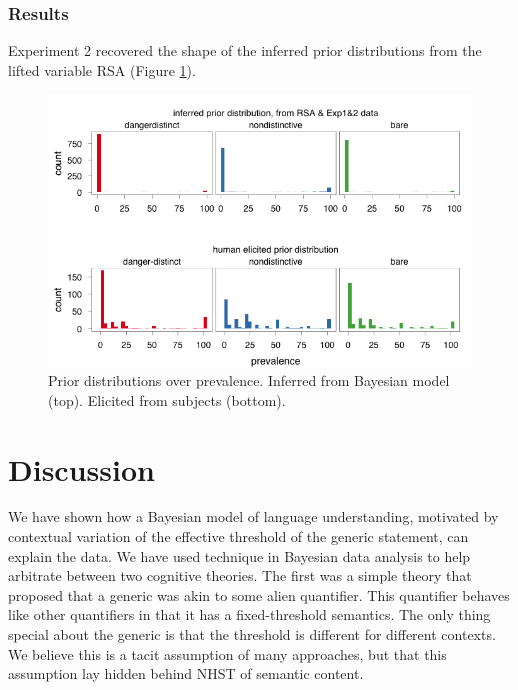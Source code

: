\documentclass[10pt,letterpaper]{article}
\begin{document}
\subsubsection{Results}

Experiment 2 recovered the shape of the inferred prior distributions from the lifted variable RSA (Figure \ref{fig:modeldatapriors}).


\begin{figure}
\centering
    \includegraphics[width=\columnwidth]{exp3hist_inferredMeanPriorExp1_2}
    \caption{Prior distributions over prevalence. Inferred from Bayesian model (top). Elicited from subjects (bottom).}
  \label{fig:modeldatapriors}
\end{figure}






\section{Discussion}

We have shown how a Bayesian model of language understanding, motivated by contextual variation of the effective threshold of the generic statement, can explain the data. We have used technique in Bayesian data analysis to help arbitrate between two cognitive theories. The first was a simple theory that proposed that a generic was akin to some alien quantifier. This quantifier behaves like other quantifiers in that it has a fixed-threshold semantics. The only thing special about the generic is that the threshold is different for different contexts. We believe this is a tacit assumption of many approaches, but that this assumption lay hidden behind NHST of semantic content.
\end{document}
